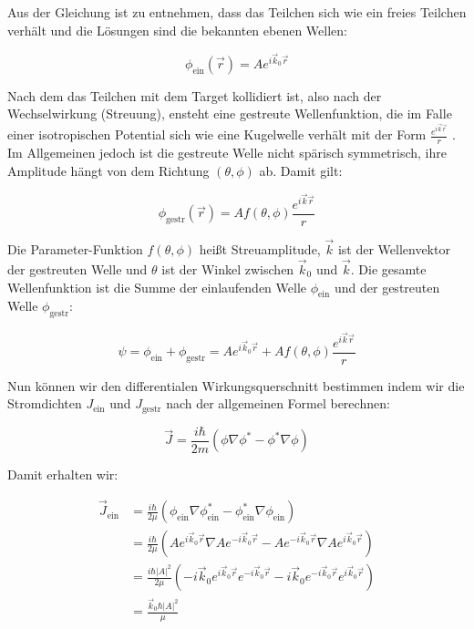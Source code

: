 Aus der Gleichung ist zu entnehmen, dass das Teilchen sich wie ein freies Teilchen verhält und die Lösungen sind die bekannten ebenen Wellen:

\begin{equation}
  \label{eq:8}
  \phi_{\text{ein}}(\vec r) = A e^{i\vec k_{0}\vec r}
\end{equation}

Nach dem das Teilchen mit dem Target kollidiert ist, also nach der Wechselwirkung (Streuung), ensteht eine gestreute Wellenfunktion, die im Falle einer isotropischen Potential sich wie eine Kugelwelle verhält mit der Form \(\frac{e^{i\vec k\vec r}}{r}\) . Im Allgemeinen jedoch ist die gestreute Welle nicht spärisch symmetrisch, ihre Amplitude hängt von dem Richtung \((\theta,\phi)\) ab. Damit gilt:

\begin{equation}
  \label{eq:9}
  \phi_{\text{gestr}}(\vec r) = A f(\theta,\phi)\frac{e^{i\vec k\vec r}}{r} 
\end{equation}


Die Parameter-Funktion \(f(\theta,\phi)\) heißt Streuamplitude, \(\vec k\) ist der Wellenvektor der gestreuten Welle und \(\theta\) ist der Winkel zwischen \(\vec k_0\) und \(\vec k\). Die gesamte Wellenfunktion ist die Summe der einlaufenden Welle \(\phi_{\text{ein}}\) und der gestreuten Welle \(\phi_{\text{gestr}}\):

\begin{equation}
  \label{eq:10}
   \psi = \phi_{\text{ein}}+ \phi_{\text{gestr}} = A e^{i\vec k_{0}\vec r} + A f(\theta,\phi)\frac{e^{i\vec k\vec r}}{r} 
\end{equation}


Nun können wir den differentialen Wirkungsquerschnitt bestimmen indem wir die Stromdichten \(J_{\text{ein}}\) und \(J_{\text{gestr}}\) nach der allgemeinen Formel berechnen:

\begin{equation}
  \label{eq:11}
  \vec J = \frac{i\hbar}{2m} (\phi \nabla \phi^* - \phi^*\nabla\phi)
\end{equation}

Damit erhalten wir:

\begin{align}
  \label{eq:12}
  \vec J_{\text{ein}} &= \frac{i\hbar}{2\mu} (\phi_{\text{ein}} \nabla \phi^*_{\text{ein}} - \phi^*_{\text{ein}}\nabla\phi_{\text{ein}})\\
&= \frac{i\hbar}{2\mu} ( A e^{i\vec k_{0}\vec r} \nabla  A e^{-i\vec k_{0}\vec r} -  A e^{-i\vec k_{0}\vec r}\nabla A e^{i\vec k_{0}\vec r} )\\
&= \frac{i\hbar|A|^2}{2\mu} (-i\vec k_{0} e^{i\vec k_{0}\vec r} e^{-i\vec k_{0}\vec r} -i\vec k_{0}  e^{-i\vec k_{0}\vec r} e^{i\vec k_{0}\vec r} )\\
&= \frac{\vec k_{0}\hbar|A|^2}{\mu}
\end{align}

